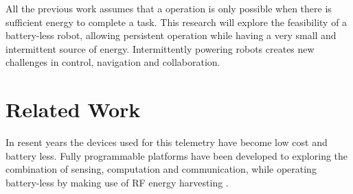 \documentclass[letterpaper, 10 pt, conference]{ieeeconf}  %
\begin{document}





All the previous work assumes that a operation is only possible when there is sufficient energy to complete a task. 
This research will explore the feasibility of a battery-less robot, allowing persistent operation while having a very small and intermittent source of energy.
Intermittently powering robots creates new challenges in control, navigation and collaboration.

\section{Related Work}

In resent years the devices used for this telemetry have become low cost and battery less.
Fully programmable platforms have been developed to exploring the combination of sensing, computation and communication, while operating battery-less by making use of RF energy harvesting \cite{WISPPAPER}.

\end{document}
